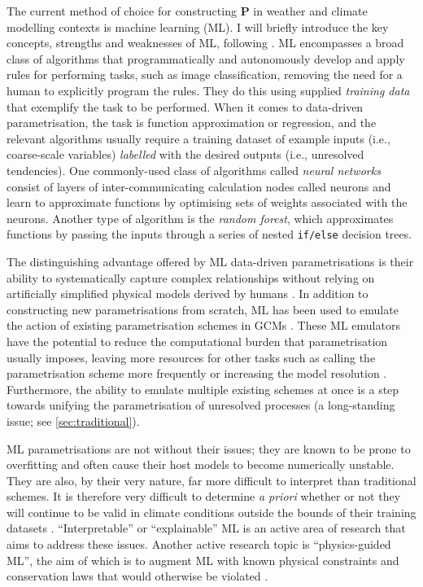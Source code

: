 \documentclass[titlepage,twoside]{article}
\numberwithin{equation}{section}
\renewcommand\vec{\bm}
\begin{document}
The current method of choice for constructing $\vec{P}$ in weather and climate
modelling contexts is machine learning (ML). I will briefly introduce the key
concepts, strengths and weaknesses of ML, following \textcite{beucler2022}. ML
encompasses a broad class of algorithms that programmatically and autonomously
develop and apply rules for performing tasks, such as image classification,
removing the need for a human to explicitly program the rules. They do this
using supplied \emph{training data} that exemplify the task to be performed.
When it comes to data-driven parametrisation, the task is function
approximation or regression, and the relevant algorithms usually require a
training dataset of example inputs (i.e., coarse-scale variables)
\emph{labelled} with the desired outputs (i.e., unresolved tendencies). One
commonly-used class of algorithms called \emph{neural networks} consist of
layers of inter-communicating calculation nodes called neurons and learn to
approximate functions by optimising sets of weights associated with the
neurons. Another type of algorithm is the \emph{random forest}, which
approximates functions by passing the inputs through a series of nested
\texttt{if/else} decision trees.

The distinguishing advantage offered by ML data-driven parametrisations is
their ability to systematically capture complex relationships without relying
on artificially simplified physical models derived by humans
\parencite{irrgang2021,beucler2022}. In addition to constructing new
parametrisations from scratch, ML has been used to emulate the action of
existing parametrisation schemes in GCMs \parencite[e.g.,][]{gentine2018}.
These ML emulators have the potential to reduce the computational burden that
parametrisation usually imposes, leaving more resources for other tasks such as
calling the parametrisation scheme more frequently or increasing the model
resolution \parencite{beucler2022}. Furthermore, the ability to emulate
multiple existing schemes at once is a step towards unifying the
parametrisation of unresolved processes (a long-standing issue; see
\cref{sec:traditional}).

ML parametrisations are not without their issues; they are known to be prone to
overfitting and often cause their host models to become numerically unstable.
They are also, by their very nature, far more difficult to interpret than
traditional schemes. It is therefore very difficult to determine \emph{a
priori} whether or not they will continue to be valid in climate conditions
outside the bounds of their training datasets
\parencite{irrgang2021,beucler2022}. ``Interpretable'' or ``explainable'' ML is
an active area of research that aims to address these issues. Another active
research topic is ``physics-guided ML'', the aim of which is to augment ML with
known physical constraints and conservation laws that would otherwise be
violated \parencite[e.g.,][]{yuval2021}.
\end{document}
